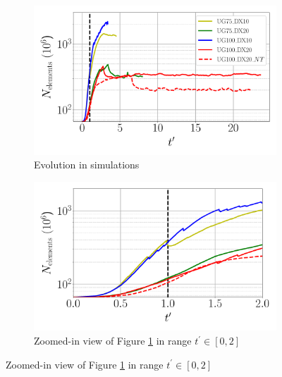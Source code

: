 \begin{figure}[ht]
\flushleft
\begin{subfigure}[b]{0.45\textwidth}
	\centering
   \includegraphics[scale=0.24]{./part2_developments/figures_ch5_resolved_JICF/JICF_nelem_evolution/JICF_nelem_increase}
   \caption{Evolution in simulations}
   \label{fig:JICF_nelem_increase_all_t} 
\end{subfigure}
\hfill
\begin{subfigure}[b]{0.45\textwidth}
	\centering
   \includegraphics[scale=0.24]{./part2_developments/figures_ch5_resolved_JICF/JICF_nelem_evolution/JICF_nelem_increase_t_in_0_2}
   \caption{Zoomed-in view of Figure \ref{fig:JICF_nelem_increase_all_t} in range $t^{\prime} \in [0, 2]$}
   \label{fig:JICF_nelem_increase_t_0_to_2}
\end{subfigure}


\end{figure}
